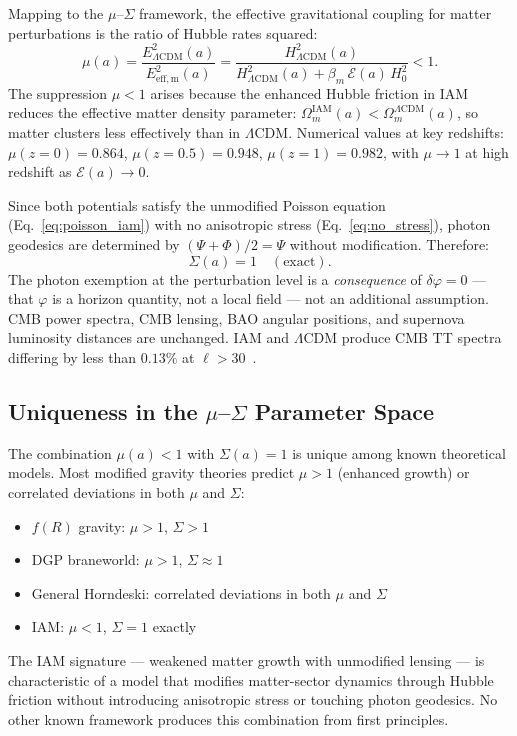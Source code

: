 \documentclass[12pt,a4paper]{article}
\begin{document}
Mapping to the $\mu$--$\Sigma$ framework, the effective gravitational
coupling for matter perturbations is the ratio of Hubble rates squared:
\begin{equation}
\boxed{\mu(a) = \frac{E^2_{\Lambda\mathrm{CDM}}(a)}{E^2_\mathrm{eff,m}(a)}
= \frac{H^2_{\Lambda\mathrm{CDM}}(a)}
{H^2_{\Lambda\mathrm{CDM}}(a) + \beta_m\,\mathcal{E}(a)\,H_0^2} < 1.}
\label{eq:mu_derived}
\end{equation}
The suppression $\mu < 1$ arises because the enhanced Hubble friction
in IAM reduces the effective matter density parameter:
$\Omega_m^\mathrm{IAM}(a) < \Omega_m^{\Lambda\mathrm{CDM}}(a)$,
so matter clusters less effectively than in $\Lambda$CDM. Numerical
values at key redshifts: $\mu(z{=}0) = 0.864$, $\mu(z{=}0.5) = 0.948$,
$\mu(z{=}1) = 0.982$, with $\mu \to 1$ at high redshift as
$\mathcal{E}(a) \to 0$.

Since both potentials satisfy the unmodified Poisson equation
(Eq.~\eqref{eq:poisson_iam}) with no anisotropic stress
(Eq.~\eqref{eq:no_stress}), photon geodesics are determined by
$(\Psi + \Phi)/2 = \Psi$ without modification. Therefore:
\begin{equation}
\Sigma(a) = 1 \quad (\text{exact}).
\label{eq:sigma_derived}
\end{equation}
The photon exemption at the perturbation level is a \textit{consequence}
of $\delta\varphi = 0$ --- that $\varphi$ is a horizon quantity, not a
local field --- not an additional assumption. CMB power spectra, CMB
lensing, BAO angular positions, and supernova luminosity distances are
unchanged. IAM and $\Lambda$CDM produce CMB TT spectra differing by
less than $0.13\%$ at $\ell > 30$~\citep{IAM_archive}.

\subsection{Uniqueness in the $\mu$--$\Sigma$ Parameter Space}

The combination $\mu(a) < 1$ with $\Sigma(a) = 1$ is unique among
known theoretical models. Most modified gravity theories predict
$\mu > 1$ (enhanced growth) or correlated deviations in both $\mu$
and $\Sigma$:
\begin{itemize}
\item $f(R)$ gravity: $\mu > 1$, $\Sigma > 1$
\item DGP braneworld: $\mu > 1$, $\Sigma \approx 1$
\item General Horndeski: correlated deviations in both $\mu$ and $\Sigma$
\item IAM: $\mu < 1$, $\Sigma = 1$ exactly
\end{itemize}
The IAM signature --- weakened matter growth with unmodified lensing
--- is characteristic of a model that modifies matter-sector dynamics
through Hubble friction without introducing anisotropic stress or
touching photon geodesics. No other known framework produces this
combination from first principles.
\end{document}
